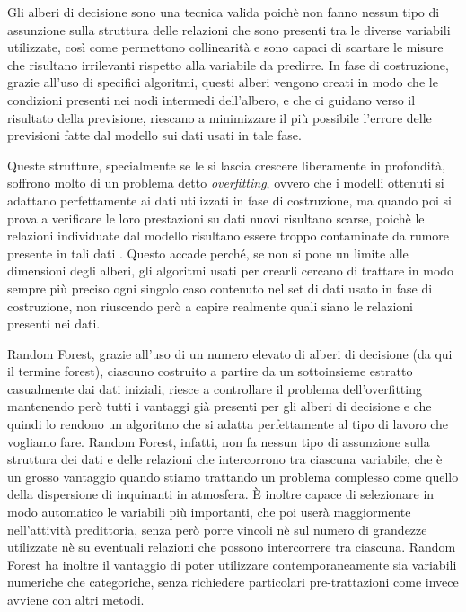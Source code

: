 \documentclass[a4paper,12pt]{report}
\begin{document}
Gli alberi di decisione sono una tecnica valida poichè non fanno nessun tipo di assunzione sulla struttura delle relazioni che sono presenti tra le diverse variabili utilizzate, così come permettono collinearità e sono capaci di scartare le misure che risultano irrilevanti rispetto alla variabile da predirre. In fase di costruzione, grazie all'uso di specifici algoritmi, questi alberi vengono creati in modo che le condizioni presenti nei nodi intermedi dell'albero, e che ci guidano verso il risultato della previsione, riescano a minimizzare il più possibile l'errore delle previsioni fatte dal modello sui dati usati in tale fase.

Queste strutture, specialmente se le si lascia crescere liberamente in profondità, soffrono molto di un problema detto \textit{overfitting}, ovvero che i modelli ottenuti si adattano perfettamente ai dati utilizzati in fase di costruzione, ma quando poi si prova a verificare le loro prestazioni su dati nuovi risultano scarse, poichè le relazioni individuate dal modello risultano essere troppo contaminate da rumore presente in tali dati \cite{bramer2007avoiding}. Questo accade perché, se non si pone un limite alle dimensioni degli alberi, gli algoritmi usati per crearli cercano di trattare in modo sempre più preciso ogni singolo caso contenuto nel set di dati usato in fase di costruzione, non riuscendo però a capire realmente quali siano le relazioni presenti nei dati.

Random Forest, grazie all'uso di un numero elevato di alberi di decisione (da qui il termine forest), ciascuno costruito a partire da un sottoinsieme estratto casualmente dai dati iniziali, riesce a controllare il problema dell'overfitting mantenendo però tutti i vantaggi già presenti per gli alberi di decisione e che quindi lo rendono un algoritmo che si adatta perfettamente al tipo di lavoro che vogliamo fare. Random Forest, infatti, non fa nessun tipo di assunzione sulla struttura dei dati e delle relazioni che intercorrono tra ciascuna variabile, che è un grosso vantaggio quando stiamo trattando un problema complesso come quello della dispersione di inquinanti in atmosfera. È inoltre capace di selezionare in modo automatico le variabili più importanti, che poi userà maggiormente nell'attività predittoria, senza però porre vincoli nè sul numero di grandezze utilizzate nè su eventuali relazioni che possono intercorrere tra ciascuna. Random Forest ha inoltre il vantaggio di poter utilizzare contemporaneamente sia variabili numeriche che categoriche, senza richiedere particolari pre-trattazioni come invece avviene con altri metodi. 
\end{document}

